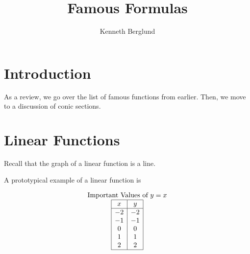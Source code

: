 \documentclass[nooutcomes]{ximera}
\author{Kenneth Berglund}
\title{Famous Formulas}
\begin{document}
\begin{abstract}
  
\end{abstract}
\maketitle

\section{Introduction}
As a review, we go over the list of famous functions from earlier. Then, we move to a discussion of conic sections. 

\section{Linear Functions}
Recall that the graph of a linear function is a line.
 
\begin{example}
A prototypical example of a linear function is
 
\begin{center}
\end{center}
 
\begin{center}
\end{center}
 
 
\[
\begin{array}{  c  }
\text{Important Values of $y=x$} \\
 \begin{array}{|c|c|}
 \hline
 x & y\\
 \hline
 -2&-2\\
 -1&-1\\
 0&0\\
 1&1\\
 2&2\\
 \hline
\end{array}
\end{array}
\]
 
\end{example}
 
\end{document}
